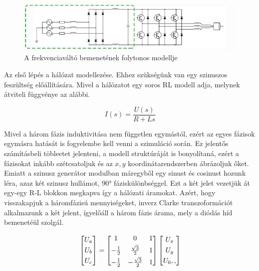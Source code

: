 \begin{figure}[H!]
	\centering
	\includegraphics[width = \textwidth]{figures/VFDschematic_choke_marked.png}
	\caption{A frekvenciaváltó bemenetének folytonos modellje} 
	\label{fig:input_marked}
\end{figure}

Az első lépés a hálózat modellezése. Ehhez szükségünk van egy szinuszos feszültség előállítására. Mivel a hálózatot egy soros RL modell adja, melynek átviteli függvénye az alábbi. 

\begin{equation}
I(s) = \frac{U(s)}{R+Ls}
\end{equation}

Mivel a három fázis induktivitása nem független egymástól, ezért az egyes fázisok egymásra hatását is fogyelembe kell venni a szimuláció során. Ez jelentős számításbeli töbleetet jelenteni, a modell struktúráját is bonyolítaná, ezért a fázisokat inkább szétcsatoljuk és az $x,y$ koordinátarendszerben ábrázoljuk őket. Emiatt a szinusz generátor modulban máregyből egy sinust és cosinust hozunk léra, azaz két szinusz hullámot, $90°$ fáziskülönbséggel. Ezt a két jelet vezetjük át egy-egy R-L blokkon megkapva így a hálózati áramokat. Azért, hogy visszakapjuk a háromfázisú mennyiségeket, inverz Clarke transzoformációt alkalmazunk a két jelent, ígyelőáll a három fázis árama, mely a diódás híd bemenetéül szolgál.

\begin{equation}
\centering
\begin{bmatrix}
       U_a\\[0.3em]
       U_b\\[0.3em]
       U_c          
\end{bmatrix}
=
\begin{bmatrix}
       1 & 0 & 1  \\[0.3em]
       -\frac{1}{2} & \frac{\sqrt{3}}{2} & 1  \\[0.3em]
       -\frac{1}{2} & -\frac{\sqrt{3}}{2} & 1 
\end{bmatrix}
\begin{bmatrix}
       U_x\\[0.3em]
       U_y\\[0.3em]
       U_0,,        
\end{bmatrix}    
\end{equation}

